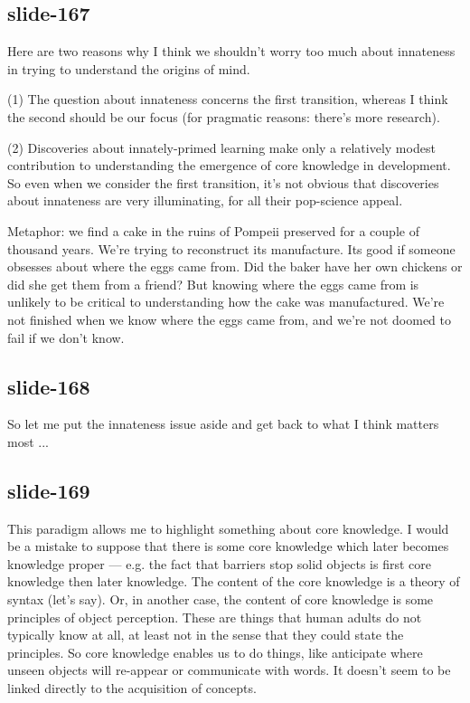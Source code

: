 \documentclass[12pt,\papersize]{extarticle}
\begin{document}
\subsection{slide-167}
Here are two reasons why I think we shouldn't worry too much about innateness in trying to
understand the origins of mind.

(1) The question about innateness concerns the first transition, whereas I think the second
should be our focus (for pragmatic reasons: there's more research).

(2) Discoveries about innately-primed learning make only a relatively modest contribution to
understanding the emergence of core knowledge in development. So even when we consider the first
transition, it's not obvious that discoveries about innateness are very illuminating, for all
their pop-science appeal.

Metaphor: we find a cake in the ruins of Pompeii preserved for a couple of thousand years. We're
trying to reconstruct its manufacture.
Its good if someone obsesses about where the eggs came from. Did the baker have her own chickens
or did she get them from a friend? But knowing where the eggs came from is unlikely to be
critical to understanding how the cake was manufactured. We're not finished when we know where
the eggs came from, and we're not doomed to fail if we don't know.

\subsection{slide-168}
So let me put the innateness issue aside and get back to what I think matters most ...

\subsection{slide-169}
This paradigm allows me to highlight something about core knowledge.
I would be a mistake to suppose that there is some core knowledge which later becomes knowledge proper --- e.g. the fact that barriers stop solid objects is first core knowledge then later knowledge.
The content of the core knowledge is a theory of syntax (let's say).
Or, in another case, the content of core knowledge is some principles of object perception.
These are things that human adults do not typically know at all, at least not in the sense that they could state the principles.
So core knowledge enables us to do things, like anticipate where unseen objects will re-appear or communicate with words.
It doesn't seem to be linked directly to the acquisition of concepts.











\end{document}
